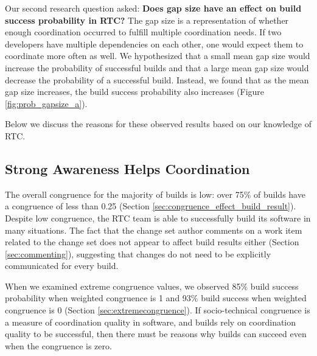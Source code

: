 \documentclass[12pt,oneside]{book}
\begin{document}
Our second research question asked:
\textbf{Does gap size have an effect on build success probability
in RTC?}
The gap size is a representation of whether enough coordination
occurred to fulfill multiple coordination needs. If two developers have multiple dependencies on each other, one would expect them to
coordinate more often as well.
We hypothesized that a small mean gap size would increase the probability of successful builds and that a large mean gap size would decrease the probability of a successful build. Instead, we found that as the mean gap size increases, the build success probability also increases (Figure \ref{fig:prob_gapsize_a}).

Below we discuss the reasons for these observed results based on our knowledge of RTC.

\subsection{Strong Awareness Helps Coordination}

The overall congruence for the majority of builds is low: over 75\% of
builds have a congruence of less than 0.25 (Section \ref{sec:congruence_effect_build_result}).
Despite low congruence, the RTC team is able to successfully build its software in many situations.
The fact that the change set author comments on a work item related to the change set does not appear to affect build results either (Section \ref{sec:commenting}), suggesting that changes do not need to be explicitly communicated for every build.


When we examined extreme congruence values, we observed 85\% build success probability when weighted congruence is 1 and 93\% build success when weighted congruence is 0 (Section \ref{sec:extremecongruence}).
If socio-technical congruence is a measure of coordination quality in software, and builds rely on coordination quality to be successful, then there must be reasons why builds can succeed even when the congruence is zero.

\end{document}
